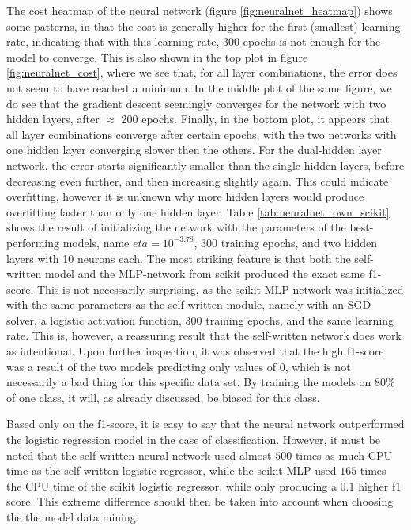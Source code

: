 \documentclass[a4paper,10pt,english]{article}
\begin{document}
The cost heatmap of the neural network (figure \ref{fig:neuralnet_heatmap}) shows some patterns, in that the cost is generally higher for the first (smallest) learning rate, indicating that with this learning rate, 300 epochs is not enough for the model to converge. This is also shown in the top plot in figure \ref{fig:neuralnet_cost}, where we see that, for all layer combinations, the error does not seem to have reached a minimum. In the middle plot of the same figure, we do see that the gradient descent seemingly converges for the network with two hidden layers, after $\approx$ 200 epochs. Finally, in the bottom plot, it appears that all layer combinations converge after certain epochs, with the two networks with one hidden layer converging slower then the others. For the dual-hidden layer network, the error starts significantly smaller than the single hidden layers, before decreasing even further, and then increasing slightly again. This could indicate overfitting, however it is unknown why more hidden layers would produce overfitting faster than only one hidden layer. Table \ref{tab:neuralnet_own_scikit} shows the result of initializing the network with the parameters of the best-performing models, name $eta = 10^{-3.78}$, 300 training epochs, and two hidden layers with 10 neurons each. The most striking feature is that both the self-written model and the MLP-network from scikit produced the exact same f1-score. This is not necessarily surprising, as the scikit MLP network was initialized with the same parameters as the self-written module, namely with an SGD solver, a logistic activation function, 300 training epochs, and the same learning rate. This is, however, a reassuring result that the self-written network does work as intentional. Upon further inspection, it was observed that the high f1-score was a result of the two models predicting only values of $0$, which is not necessarily a bad thing for this specific data set. By training the models on $80\%$ of one class, it will, as already discussed, be biased for this class. 

Based only on the f1-score, it is easy to say that the neural network outperformed the logistic regression model in the case of classification. However, it must be noted that the self-written neural network used almost $500$ times as much CPU time as the self-written logistic regressor, while the scikit MLP used $165$ times the CPU time of the scikit logistic regressor, while only producing a $0.1$ higher f1 score. This extreme difference should then be taken into account when choosing the the model data mining. 
\end{document}
